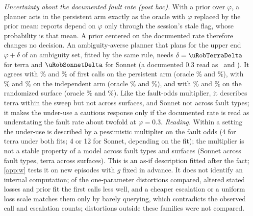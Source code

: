 \emph{Uncertainty about the documented fault rate (post hoc).} With a prior over $\varphi$, a planner acts in the persistent arm exactly as the oracle with $\varphi$ replaced by the prior mean: reports depend on $\varphi$ only through the session's stale flag, whose probability is that mean. A prior centered on the documented rate therefore changes no decision. An ambiguity-averse planner \citep{ellsberg1961risk} that plans for the upper end $\varphi+\delta$ of an ambiguity set, fitted by the same rule, needs $\delta=\uRobTerraDelta$ for terra and $\uRobSonnetDelta$ for Sonnet (a documented 0.3 read as \uRobTerraPhiThree\ and \uRobSonnetPhiThree). It agrees with \uRobTerraFit\% and \uRobSonnetFit\% of first calls on the persistent arm (oracle \uRobTerraOracleFit\% and \uRobSonnetOracleFit\%), with \uRobTerraIndep\% and \uRobSonnetIndep\% on the independent arm (oracle \uRobTerraOracleIndep\% and \uRobSonnetOracleIndep\%), and with \uRobTerraRand\% and \uRobSonnetRand\% on the randomized surface (oracle \zTerraOracleMatchRand\% and \zSonnetOracleMatchRand\%). Like the fault-odds multiplier, it describes terra within the sweep but not across surfaces, and Sonnet not across fault types; it makes the under-use a cautious response only if the documented rate is read as understating the fault rate about twofold at $\varphi=0.3$.
\emph{Reading.} Within a setting the under-use is described by a pessimistic multiplier on the fault odds (4 for terra under both fits; 4 or 12 for Sonnet, depending on the fit); the multiplier is not a stable property of a model across fault types and surfaces (Sonnet across fault types, terra across surfaces). This is an as-if description fitted after the fact; \cref{app:w} tests it on new episodes with $g$ fixed in advance. It does not identify an internal computation; of the one-parameter distortions compared, altered stated losses and prior fit the first calls less well, and a cheaper escalation or a uniform loss scale matches them only by barely querying, which contradicts the observed call and escalation counts; distortions outside these families were not compared.

\begin{table}[!htbp]
\centering
\caption{Exploratory as-if models of the first action (fitted on the persistent arm of the sweep; other columns are not used for fitting). Log-likelihood per first action in nats, noise only / pessimism plus noise (higher is better; uniform: $-1.61$). Deterministic rule: fitted $g$; share of episodes (\%) whose first-call choice agrees with the run's, for the rule / the exact oracle / ``never the replica tool''; mean regret of the run and of the rule over the 200 sweep episodes.}
\label{tab:asif}
\scriptsize\setlength{\tabcolsep}{3pt}
\resizebox{\linewidth}{!}{}
\end{table}

